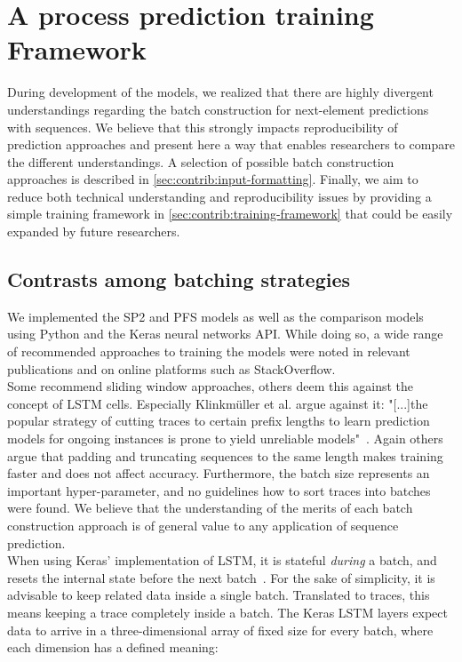 \chapter{A process prediction training Framework}
\label{chap:training-framework}
During development of the models, we realized that there are highly divergent understandings regarding the batch construction for next-element predictions with sequences. We believe that this strongly impacts reproducibility of prediction approaches and present here a way that enables researchers to compare the different understandings. A selection of possible batch construction approaches is described in \autoref{sec:contrib:input-formatting}. Finally, we aim to reduce both technical understanding and reproducibility issues by providing a simple training framework in \autoref{sec:contrib:training-framework} that could be easily expanded by future researchers.

\section{Contrasts among batching strategies}
\label{sec:contrib:input-formatting}
We implemented the SP2 and PFS models as well as the comparison models using Python and the Keras neural networks API. While doing so, a wide range of recommended approaches to training the models were noted in relevant publications and on online platforms such as StackOverflow.\\

Some recommend sliding window approaches, others deem this against the concept of LSTM cells. Especially Klinkmüller et al. argue against it: "[...]the popular strategy of cutting traces to certain prefix lengths to learn prediction models for ongoing instances is prone to yield unreliable models"~\cite{klinkmuller2018reliablemonitoring}. Again others argue that padding and truncating sequences to the same length makes training faster and does not affect accuracy. Furthermore, the batch size represents an important hyper-parameter, and no guidelines how to sort traces into batches were found. We believe that the understanding of the merits of each batch construction approach is of general value to any application of sequence prediction.\\

When using Keras' implementation of LSTM, it is stateful \textit{during} a batch, and resets the internal state before the next batch~\cite{web:keras}. For the sake of simplicity, it is advisable to keep related data inside a single batch. Translated to traces, this means keeping a trace completely inside a batch. The Keras LSTM layers expect data to arrive in a three-dimensional array of fixed size for every batch, where each dimension has a defined meaning:

